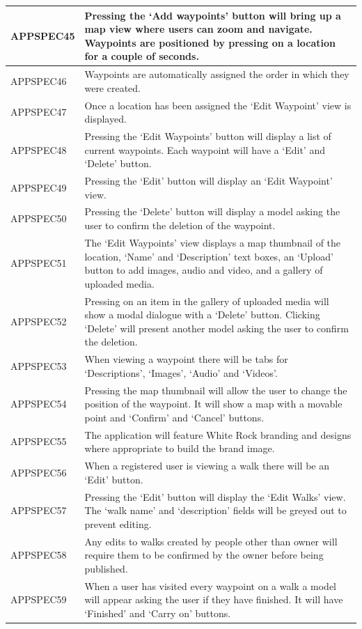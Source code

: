 \documentclass[11pt,a4paper]{article}
\begin{document}
\begin{longtable}{|p{2.5cm}p{13cm}|}
APPSPEC45 & Pressing the `Add waypoints' button will bring up a map view where users can zoom and navigate. Waypoints are positioned by pressing on a location for a couple of seconds. \\ \hline
APPSPEC46 & Waypoints are automatically assigned the order in which they were created. \\ \hline
APPSPEC47 & Once a location has been assigned the `Edit Waypoint' view is displayed.\\ \hline
APPSPEC48 & Pressing the `Edit Waypoints' button will display a list of current waypoints. Each waypoint will have a `Edit' and `Delete' button. \\ \hline
APPSPEC49 & Pressing the `Edit' button will display an `Edit Waypoint' view. \\ \hline
APPSPEC50 & Pressing the `Delete' button will display a model asking the user to confirm the deletion of the waypoint. \\ \hline
APPSPEC51 & The `Edit Waypoints' view displays a map thumbnail of the location, `Name' and `Description' text boxes, an `Upload' button to add images, audio and video, and a gallery of uploaded media. \\ \hline
APPSPEC52 & Pressing on an item in the gallery of uploaded media will show a modal dialogue with a `Delete' button. Clicking `Delete' will present another model asking the user to confirm the deletion. \\ \hline
APPSPEC53 & When viewing a waypoint there will be tabs for `Descriptions', `Images', `Audio' and `Videos'. \\ \hline
APPSPEC54 & Pressing the map thumbnail will allow the user to change the position of the waypoint. It will show a map with a movable point and `Confirm' and `Cancel' buttons. \\ \hline
APPSPEC55 & The application will feature White Rock branding and designs where appropriate to build the brand image. \\ \hline
APPSPEC56 & When a registered user is viewing a walk there will be an `Edit' button. \\ \hline
APPSPEC57 & Pressing the `Edit' button will display the `Edit Walks' view. The `walk name' and `description' fields will be greyed out to prevent editing.\\ \hline
APPSPEC58 & Any edits to walks created by people other than owner will require them to be confirmed by the owner before being published. \\ \hline
APPSPEC59 & When a user has visited every waypoint on a walk a model will appear asking the user if they have finished. It will have `Finished' and `Carry on' buttons. \\ \hline

\end{longtable}
\end{document}

